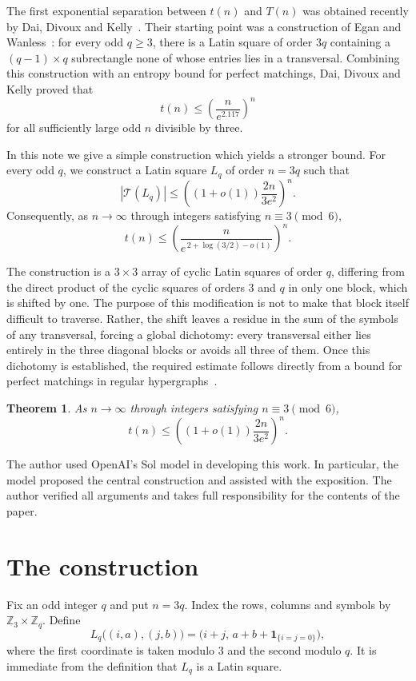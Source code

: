 \documentclass[11pt]{article}
\newtheorem{theorem}{Theorem}
\theoremstyle{remark}
\newcommand{\Z}{\mathbb Z}
\newcommand{\1}{\mathbf 1}
\newcommand{\T}{\mathcal T}
\begin{document}
The first exponential separation between $t(n)$ and $T(n)$ was obtained recently by Dai, Divoux and Kelly~\cite{DDK}. Their starting point was a construction of Egan and Wanless~\cite{EganWanless}: for every odd $q\geq 3$, there is a Latin square of order $3q$ containing a $(q-1)\times q$ subrectangle none of whose entries lies in a transversal. Combining this construction with an entropy bound for perfect matchings, Dai, Divoux and Kelly proved that
\[
 t(n)\leq \left(\frac{n}{e^{2.117}}\right)^n
\]
for all sufficiently large odd $n$ divisible by three.

In this note we give a simple construction which yields a stronger bound. For every odd $q$, we construct a Latin square $L_q$ of order $n=3q$ such that
\[
 |\T(L_q)|
 \leq
 \left((1+o(1))\frac{2n}{3e^2}\right)^n.
\]
Consequently, as $n\to\infty$ through integers satisfying $n\equiv3\pmod6$,
\[
 t(n)\leq
 \left(
 \frac{n}{e^{\,2+\log(3/2)-o(1)}}
 \right)^n.
\]

The construction is a $3\times3$ array of cyclic Latin squares of order $q$, differing from the direct product of the cyclic squares of orders $3$ and $q$ in only one block, which is shifted by one. The purpose of this modification is not to make that block itself difficult to traverse. Rather, the shift leaves a residue in the sum of the symbols of any transversal, forcing a global dichotomy: every transversal either lies entirely in the three diagonal blocks or avoids all three of them. Once this dichotomy is established, the required estimate follows directly from a bound for perfect matchings in regular hypergraphs~\cite{LuriaQueens}.

\begin{theorem}\label{thm:main}
As $n\to\infty$ through integers satisfying $n\equiv3\pmod6$,
\[
 t(n)\leq
 \left((1+o(1))\frac{2n}{3e^2}\right)^n.
\]
\end{theorem}

The author used OpenAI’s Sol model in developing this work. In particular, the model proposed the central construction and assisted with the exposition. The author verified all arguments and takes full responsibility for the contents of the paper.

\section{The construction}

Fix an odd integer $q$ and put $n=3q$. Index the rows, columns and symbols by $\Z_3\times\Z_q$. Define
\begin{equation}\label{eq:construction}
 L_q\big((i,a),(j,b)\big)
 =\big(i+j,\,a+b+\1_{\{i=j=0\}}\big),
\end{equation}
where the first coordinate is taken modulo $3$ and the second modulo $q$.
It is immediate from the definition that $L_q$ is a Latin square.
\end{document}
